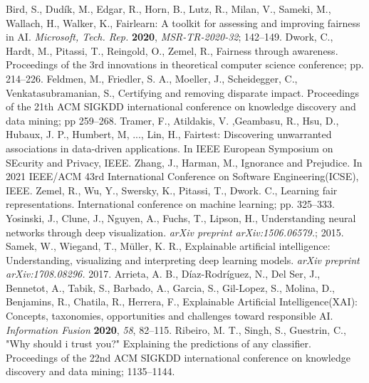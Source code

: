 \documentclass[journal,article,submit,moreauthors,pdftex]{Definitions/mdpi}
\begin{document}
\begin{thebibliography}{999}
Bird, S., Dudík, M., Edgar, R., Horn, B., Lutz, R., Milan, V., Sameki, M., Wallach, H., Walker, K., Fairlearn: A toolkit for assessing and improving fairness in AI. {\em Microsoft, Tech. Rep.} {\bf 2020}, {\em MSR-TR-2020-32}; 142--149.
Dwork, C., Hardt, M., Pitassi, T., Reingold, O., Zemel, R., Fairness through awareness. Proceedings of the 3rd innovations in theoretical computer science conference; pp. 214--226.
Feldmen, M., Friedler, S. A., Moeller, J., Scheidegger, C., Venkatasubramanian, S., Certifying and removing disparate impact. Proceedings of the 21th ACM SIGKDD international conference on knowledge discovery and data mining; pp 259--268.
Tramer, F., Atildakis, V. ,Geambasu, R., Hsu, D., Hubaux, J. P., Humbert, M, ..., Lin, H., Fairtest: Discovering unwarranted associations in data-driven applications. In IEEE European Symposium on SEcurity and Privacy, IEEE.
Zhang, J., Harman, M., Ignorance and Prejudice. In 2021 IEEE/ACM 43rd International Conference on Software Engineering(ICSE), IEEE.
Zemel, R., Wu, Y., Swersky, K., Pitassi, T., Dwork. C., Learning fair representations. International conference on machine learning; pp. 325--333.
Yosinski, J., Clune, J., Nguyen, A., Fuchs, T., Lipson, H., Understanding neural networks through deep visualization. \textit{arXiv preprint arXiv:1506.06579.}; 2015.
Samek, W., Wiegand, T., Müller, K. R., Explainable artificial intelligence: Understanding, visualizing and interpreting deep learning models. \textit{arXiv preprint arXiv:1708.08296.} 2017.
Arrieta, A. B., Díaz-Rodríguez, N., Del Ser, J., Bennetot, A., Tabik, S., Barbado, A., Garcia, S., Gil-Lopez, S., Molina, D., Benjamins, R., Chatila, R., Herrera, F., Explainable Artificial Intelligence(XAI): Concepts, taxonomies, opportunities and challenges toward responsible AI. {\em Information Fusion} {\bf 2020}, {\em 58}, 82--115.
Ribeiro, M. T., Singh, S., Guestrin, C., "Why should i trust you?" Explaining the predictions of any classifier. Proceedings of the 22nd ACM SIGKDD international conference on knowledge discovery and data mining; 1135--1144.

\end{thebibliography}
\end{document}
